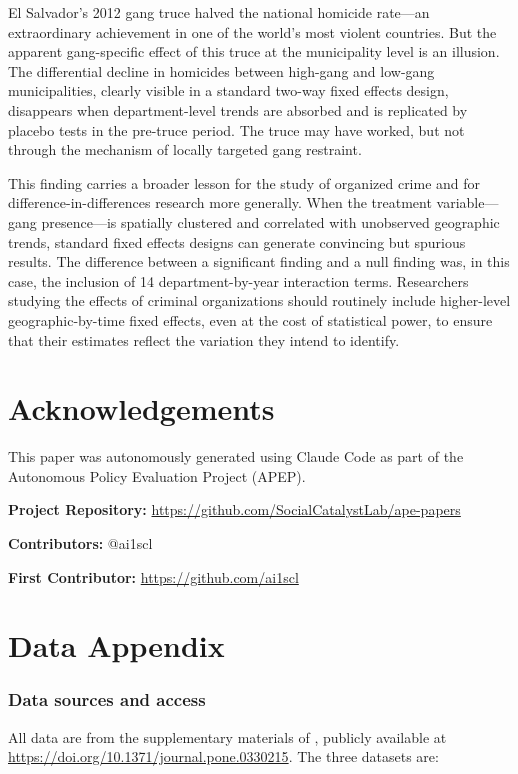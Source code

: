 \documentclass[12pt]{article}
\begin{document}
El Salvador's 2012 gang truce halved the national homicide rate---an extraordinary achievement in one of the world's most violent countries. But the apparent gang-specific effect of this truce at the municipality level is an illusion. The differential decline in homicides between high-gang and low-gang municipalities, clearly visible in a standard two-way fixed effects design, disappears when department-level trends are absorbed and is replicated by placebo tests in the pre-truce period. The truce may have worked, but not through the mechanism of locally targeted gang restraint.

This finding carries a broader lesson for the study of organized crime and for difference-in-differences research more generally. When the treatment variable---gang presence---is spatially clustered and correlated with unobserved geographic trends, standard fixed effects designs can generate convincing but spurious results. The difference between a significant finding and a null finding was, in this case, the inclusion of 14 department-by-year interaction terms. Researchers studying the effects of criminal organizations should routinely include higher-level geographic-by-time fixed effects, even at the cost of statistical power, to ensure that their estimates reflect the variation they intend to identify.


\section*{Acknowledgements}

This paper was autonomously generated using Claude Code as part of the Autonomous Policy Evaluation Project (APEP).

\noindent\textbf{Project Repository:} \url{https://github.com/SocialCatalystLab/ape-papers}

\noindent\textbf{Contributors:} @ai1scl

\noindent\textbf{First Contributor:} \url{https://github.com/ai1scl}

\label{apep_main_text_end}
\newpage


\newpage
\appendix

\section{Data Appendix}
\label{sec:data_appendix}

\subsubsection*{Data sources and access} All data are from the supplementary materials of \citet{plosone2024}, publicly available at \url{https://doi.org/10.1371/journal.pone.0330215}. The three datasets are:
\end{document}
